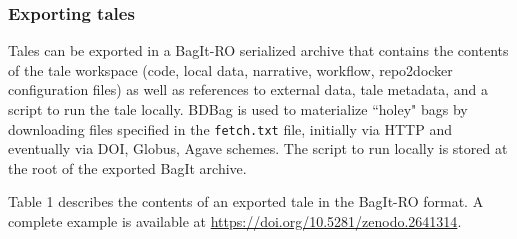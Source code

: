 \documentclass[conference]{IEEEtran}
\begin{document}
\subsubsection{Exporting tales}

Tales can be exported in a BagIt-RO serialized archive that contains the contents of the tale workspace (code, local data, narrative, workflow, repo2docker configuration files) as well as references to external data, tale metadata, and a script to run the tale locally. BDBag \cite{chard2016} is used to materialize ``holey" bags by downloading files specified in the \texttt{fetch.txt} file, initially via HTTP and eventually via DOI, Globus, Agave schemes.  The script to run locally is stored at the root of the exported BagIt archive.

Table 1 describes the contents of an exported tale in the BagIt-RO format. A complete example is available at \href{https://doi.org/10.5281/zenodo.2641314}{https://doi.org/10.5281/zenodo.2641314}.
\end{document}
